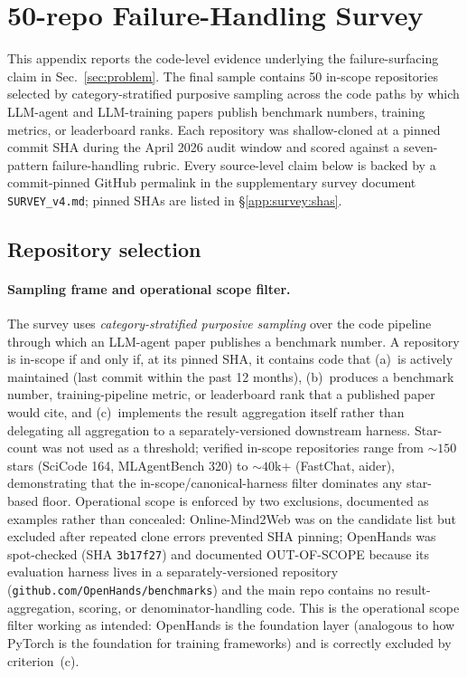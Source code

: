 \documentclass{article}
\begin{document}
\section{50-repo Failure-Handling Survey}
\label{app:survey}

This appendix reports the code-level evidence underlying the
failure-surfacing claim in Sec.~\ref{sec:problem}. The final
sample contains 50 in-scope repositories selected by
category-stratified purposive sampling across the code paths by
which LLM-agent and LLM-training papers publish benchmark
numbers, training metrics, or leaderboard ranks. Each repository
was shallow-cloned at a pinned commit SHA during the April 2026
audit window and scored against a seven-pattern failure-handling
rubric. Every source-level claim below is backed by a
commit-pinned GitHub permalink in the supplementary survey
document \texttt{SURVEY\_v4.md}; pinned SHAs are listed in
\S\ref{app:survey:shas}.

\subsection{Repository selection}
\label{app:survey:selection}

\paragraph{Sampling frame and operational scope filter.}
The survey uses \emph{category-stratified purposive sampling}
over the code pipeline through which an LLM-agent paper
publishes a benchmark number. A repository is in-scope if and
only if, at its pinned SHA, it contains code that (a)~is
actively maintained (last commit within the past 12 months),
(b)~produces a benchmark number, training-pipeline metric, or
leaderboard rank that a published paper would cite, and
(c)~implements the result aggregation itself rather than
delegating all aggregation to a separately-versioned downstream
harness. Star-count was not used as a threshold; verified
in-scope repositories range from $\sim\!150$ stars (SciCode
164, MLAgentBench 320) to $\sim\!40$k+ (FastChat, aider),
demonstrating that the in-scope/canonical-harness filter
dominates any star-based floor. Operational scope is enforced
by two exclusions, documented as examples rather than
concealed: Online-Mind2Web was on the candidate list but
excluded after repeated clone errors prevented SHA pinning;
OpenHands was spot-checked (SHA \texttt{3b17f27}) and
documented OUT-OF-SCOPE because its evaluation harness lives in
a separately-versioned repository
(\texttt{github.com/OpenHands/benchmarks}) and the main repo
contains no result-aggregation, scoring, or denominator-handling
code. This is the operational scope filter working as intended:
OpenHands is the foundation layer (analogous to how PyTorch is
the foundation for training frameworks) and is correctly
excluded by criterion~(c).
\end{document}
